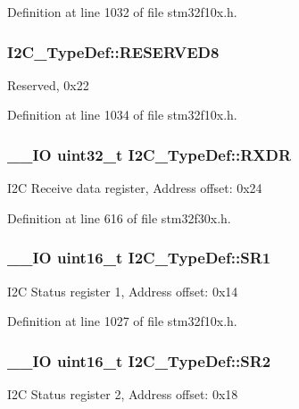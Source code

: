 Definition at line 1032 of file stm32f10x.\-h.

\hypertarget{struct_i2_c___type_def_a6e762751c9d5a1e41efb6033a26d8ed8}{
\subsubsection[{R\-E\-S\-E\-R\-V\-E\-D8}]{ I2\-C\-\_\-\-Type\-Def\-::\-R\-E\-S\-E\-R\-V\-E\-D8}}\label{struct_i2_c___type_def_a6e762751c9d5a1e41efb6033a26d8ed8}
Reserved, 0x22 

Definition at line 1034 of file stm32f10x.\-h.

\hypertarget{struct_i2_c___type_def_a43d30d8efd8e4606663c7cb8d2565e12}{
\subsubsection[{R\-X\-D\-R}]{\setlength{\rightskip}{0pt plus 5cm}\-\_\-\-\_\-\-I\-O {\bf uint32\-\_\-t} I2\-C\-\_\-\-Type\-Def\-::\-R\-X\-D\-R}}\label{struct_i2_c___type_def_a43d30d8efd8e4606663c7cb8d2565e12}
I2\-C Receive data register, Address offset\-: 0x24 

Definition at line 616 of file stm32f30x.\-h.

\hypertarget{struct_i2_c___type_def_ae1602cd1c9cad449523099c97138f991}{
\subsubsection[{S\-R1}]{\setlength{\rightskip}{0pt plus 5cm}\-\_\-\-\_\-\-I\-O {\bf uint16\-\_\-t} I2\-C\-\_\-\-Type\-Def\-::\-S\-R1}}\label{struct_i2_c___type_def_ae1602cd1c9cad449523099c97138f991}
I2\-C Status register 1, Address offset\-: 0x14 

Definition at line 1027 of file stm32f10x.\-h.

\hypertarget{struct_i2_c___type_def_a95c7f729b10eb2acafe499d9c9a81a83}{
\subsubsection[{S\-R2}]{\setlength{\rightskip}{0pt plus 5cm}\-\_\-\-\_\-\-I\-O {\bf uint16\-\_\-t} I2\-C\-\_\-\-Type\-Def\-::\-S\-R2}}\label{struct_i2_c___type_def_a95c7f729b10eb2acafe499d9c9a81a83}
I2\-C Status register 2, Address offset\-: 0x18 

